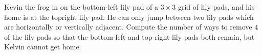 Kevin the frog in on the bottom-left lily pad of a $3 \times 3$ grid of lily pads, and his home is at the topright lily pad. He can only jump between two lily pads which are horizontally or vertically adjacent. Compute the number of ways to remove $4$ of the lily pads so that the bottom-left and top-right lily pads both remain, but Kelvin cannot get home.